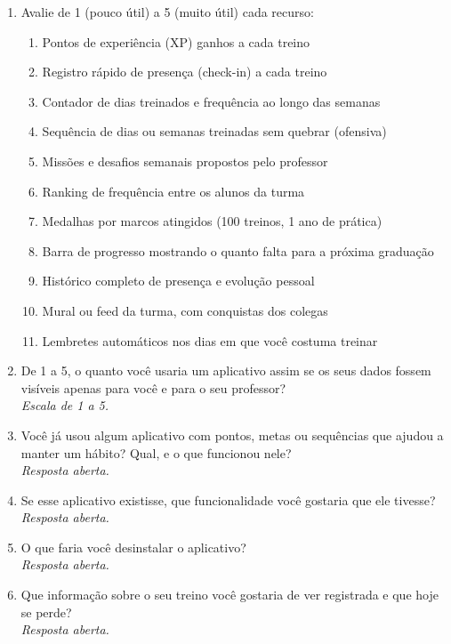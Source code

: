 \begin{enumerate}[leftmargin=*, itemsep=1pt, parsep=0pt]
  \item Avalie de 1 (pouco útil) a 5 (muito útil) cada recurso:
  \begin{enumerate}[label=\alph*)]
    \item Pontos de experiência (XP) ganhos a cada treino
    \item Registro rápido de presença (check-in) a cada treino
    \item Contador de dias treinados e frequência ao longo das semanas
    \item Sequência de dias ou semanas treinadas sem quebrar (ofensiva)
    \item Missões e desafios semanais propostos pelo professor
    \item Ranking de frequência entre os alunos da turma
    \item Medalhas por marcos atingidos (100 treinos, 1 ano de prática)
    \item Barra de progresso mostrando o quanto falta para a próxima graduação
    \item Histórico completo de presença e evolução pessoal
    \item Mural ou feed da turma, com conquistas dos colegas
    \item Lembretes automáticos nos dias em que você costuma treinar
  \end{enumerate}
  \item De 1 a 5, o quanto você usaria um aplicativo assim se os seus dados fossem visíveis apenas para você e para o seu professor?\\
        {\footnotesize\textit{Escala de 1 a 5.}}
  \item Você já usou algum aplicativo com pontos, metas ou sequências que ajudou a manter um hábito? Qual, e o que funcionou nele?\\
        {\footnotesize\textit{Resposta aberta.}}
  \item Se esse aplicativo existisse, que funcionalidade você gostaria que ele tivesse?\\
        {\footnotesize\textit{Resposta aberta.}}
  \item O que faria você desinstalar o aplicativo?\\
        {\footnotesize\textit{Resposta aberta.}}
  \item Que informação sobre o seu treino você gostaria de ver registrada e que hoje se perde?\\
        {\footnotesize\textit{Resposta aberta.}}
\end{enumerate}

